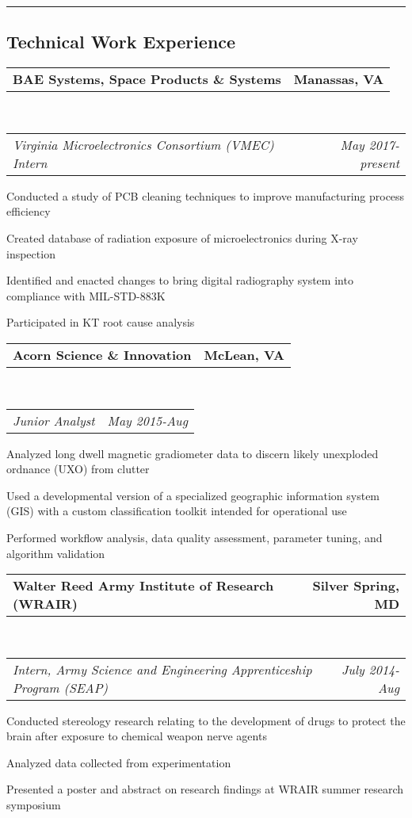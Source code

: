 \documentclass[10pt,letterpaper]{article}
\makeatletter
\newcommand{\headerrow}[2]
{\begin{tabular*}{\linewidth}{l@{\extracolsep{\fill}}r}
	#1 &
	#2 \\
\end{tabular*}}
\makeatother
\begin{document}
\hrule
\vspace{-0.4em}
\subsection*{Technical Work Experience}
\headerrow
		{\textbf{BAE Systems, Space Products \& Systems}}
		{\textbf{Manassas, VA}}
	\\
	\headerrow
		{\emph{Virginia Microelectronics Consortium (VMEC) Intern}}
		{\emph{May 2017-present}}
\begin{itemize*}
		\item Conducted a study of PCB cleaning techniques to improve manufacturing process efficiency
		\item Created database of radiation exposure of microelectronics during X-ray inspection
		\item Identified and enacted changes to bring digital radiography system into compliance with MIL-STD-883K
		\item Participated in KT root cause analysis
	\end{itemize*}
	\headerrow
		{\textbf{Acorn Science \& Innovation}}
		{\textbf{McLean, VA}}
	\\
	\headerrow
		{\emph{Junior Analyst}}
		{\emph{May 2015-Aug}}
	\begin{itemize*}
		\item Analyzed long dwell magnetic gradiometer data to
			discern likely unexploded ordnance (UXO) from clutter
		\item Used a developmental version of a specialized geographic information system (GIS) with 			a custom classification toolkit intended for operational use
		\item Performed workflow analysis, data
quality assessment, parameter tuning, and algorithm validation
	\end{itemize*}
	\headerrow
		{\textbf{Walter Reed Army Institute of Research (WRAIR)}}
		{\textbf{Silver Spring, MD}}
	\\
	\headerrow
		{\emph{Intern, Army Science and Engineering Apprenticeship Program (SEAP)}}
		{\emph{July 2014-Aug}}
	\begin{itemize*}
		\item Conducted stereology research relating to the development of drugs to protect the brain after exposure to chemical weapon nerve agents
		\item Analyzed data collected from experimentation
		\item Presented a poster and abstract on research findings at WRAIR summer research symposium
	\end{itemize*}
	
\end{document}
